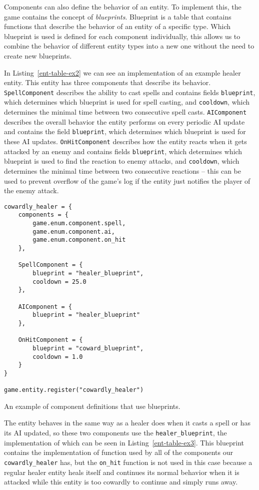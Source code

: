 Components can also define the behavior of an entity. To implement this, the game contains the concept of \emph{blueprints}. Blueprint
is a table that contains functions that describe the behavior of an entity of a specific type. Which blueprint is used is defined
for each component individually, this allows us to combine the behavior of different entity types into a new one without the need
to create new blueprints.

In Listing~\ref{ent-table-ex2} we can see an implementation of an example healer entity. This entity has three components that describe
its behavior. \texttt{SpellComponent} describes the ability to cast spells and contains fields \texttt{blueprint}, which determines
which blueprint is used for spell casting, and \texttt{cooldown}, which determines the minimal time between two consecutive spell casts.
\texttt{AIComponent} describes the overall behavior the entity performs on every periodic AI update and contains the field
\texttt{blueprint}, which determines which blueprint is used for these AI updates. \texttt{OnHitComponent} describes how the entity
reacts when it gets attacked by an enemy and contains fields \texttt{blueprint}, which determines which blueprint is used to find the
reaction to enemy attacks, and \texttt{cooldown}, which determines the minimal time between two consecutive reactions -- this can be used
to prevent overflow of the game's log if the entity just notifies the player of the enemy attack.

\begin{listing}[H]
    \centering
    \begin{lstlisting}
cowardly_healer = {
    components = {
        game.enum.component.spell,
        game.enum.component.ai,
        game.enum.component.on_hit
    },

    SpellComponent = {
        blueprint = "healer_blueprint",
        cooldown = 25.0
    },

    AIComponent = {
        blueprint = "healer_blueprint"
    },

    OnHitComponent = {
        blueprint = "coward_blueprint",
        cooldown = 1.0
    }
}

game.entity.register("cowardly_healer")
    \end{lstlisting}
    \caption{An example of component definitions that use blueprints.}
    \label{ent-table-ex2}
\end{listing}

The entity behaves in the same way as a healer does when it casts a spell or has its AI updated, so these two components use the
\texttt{healer\_blueprint}, the implementation of which can be seen in Listing~\ref{ent-table-ex3}. This blueprint contains the
implementation of function used by all of the components our \texttt{cowardly\_healer} has, but the \texttt{on\_hit} function
is not used in this case because a regular healer entity heals itself and continues its normal behavior when it is attacked while this entity
is too cowardly to continue and simply runs away.

